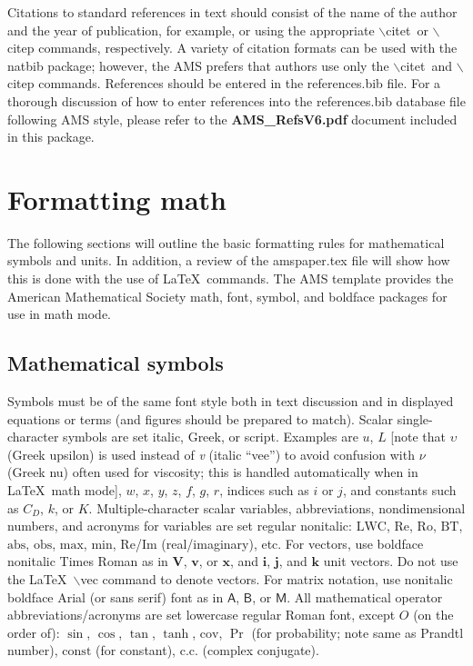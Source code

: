\documentclass{ametsocV6.1}
\begin{document}
Citations to standard references in text should consist of the name of the
author and the year of publication, for example, \citet{Becker+Schmitz2003} or
\citep{Becker+Schmitz2003} using the appropriate $\backslash$citet\ or
$\backslash$citep commands, respectively. A variety of citation formats can
be used with the natbib package; however, the AMS prefers that authors use only the $\backslash$citet\ and
$\backslash$citep commands. References should be entered in the references.bib file. For a thorough
discussion of how to enter references into the references.bib database file
following AMS style, please refer to the \textbf{AMS\_RefsV6.pdf} document
included in this package.

\section{Formatting math}
The following sections will outline the basic formatting rules for
mathematical symbols and units.  In addition, a review of the amspaper.tex
file will show how this is done with the use of \LaTeX\ commands.  The AMS
template provides the American Mathematical Society math, font, symbol, and
boldface packages for use in math mode.

\subsection{Mathematical symbols}
Symbols must be of the same font style both in text discussion and in
displayed equations or terms (and figures should be prepared to match).
Scalar single-character symbols are set italic, Greek, or script. Examples
are $u$, $L$ [note that $\upsilon$ (Greek upsilon) is used instead of
\textit{v} (italic ``vee'') to avoid confusion with $\nu$ (Greek nu) often
used for viscosity; this is handled automatically when in \LaTeX\ math mode],
$w$, $x$, $y$, $z$, $f$, $g$, $r$, indices such as $i$ or $j$, and constants
such as $C_D$, $k$, or $K$. Multiple-character scalar variables,
abbreviations, nondimensional numbers, and acronyms for variables are set
regular nonitalic: $\mathrm{LWC}$, $\mathrm{Re}$, $\mathrm{Ro}$,
$\mathrm{BT}$, $\mathrm{abs}$, $\mathrm{obs}$, $\mathrm{max}$,
$\mathrm{min}$, $\mathrm{Re}$/$\mathrm{Im}$ (real/imaginary), etc. For
vectors, use boldface nonitalic Times Roman as in $\mathbf{V}$, $\mathbf{v}$,
or $\mathbf{x}$, and $\mathbf{i}$, $\mathbf{j}$, and $\mathbf{k}$ unit
vectors. Do not use the \LaTeX\ $\backslash$vec command to denote vectors.
For matrix notation, use nonitalic boldface Arial (or sans serif) font as in
$\bm{\mathsf{A}}$, $\bm{\mathsf{B}}$, or $\bm{\mathsf{M}}$.  All mathematical
operator abbreviations/acronyms are set lowercase regular Roman font, except
$O$ (on the order of): $\sin$, $\cos$, $\tan$, $\tanh$, $\mathrm{cov}$, $\Pr$
(for probability; note same as Prandtl number), $\mathrm{const}$ (for
constant), $\mathrm{c.c.}$ (complex conjugate).
\end{document}
